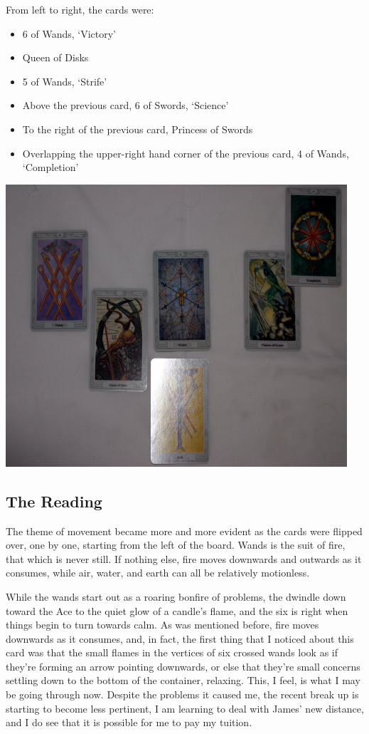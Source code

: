 From left to right, the cards were:
\begin{itemize}
  \item 6 of Wands, `Victory'
  \item Queen of Disks
  \item 5 of Wands, `Strife'
  \item Above the previous card, 6 of Swords, `Science'
  \item To the right of the previous card, Princess of Swords
  \item Overlapping the upper-right hand corner of the previous card, 4
  of Wands, `Completion'
\end{itemize}
\includegraphics{image8-13-08.png}

\subsection*{The Reading}
The theme of movement became more and more evident as the cards were
flipped over, one by one, starting from the left of the board.  Wands
is the suit of fire, that which is never still.  If nothing else, fire
moves downwards and outwards as it consumes, while air, water, and earth
can all be relatively motionless.  

While the wands start out as a roaring bonfire of problems, the dwindle 
down toward the Ace to the quiet glow of a candle's flame, and the six 
is right when things begin to turn towards calm.  As was mentioned
before, fire moves downwards as it consumes, and, in fact, the first
thing that I noticed about this card was that the small flames in the
vertices of six crossed wands look as if they're forming an arrow
pointing downwards, or else that they're small concerns settling down to
the bottom of the container, relaxing.  This, I feel, is what I may be
going through now.  Despite the problems it caused me, the recent break
up is starting to become less pertinent, I am learning to deal with
James' new distance, and I do see that it is possible for me to pay my
tuition.


